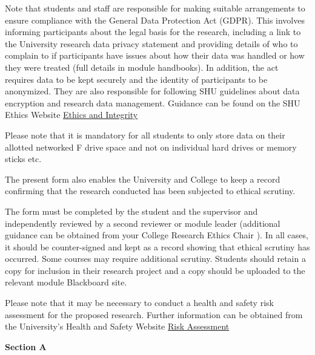 \documentclass{article}
\begin{document}
Note that students and staff are responsible for making suitable arrangements to ensure compliance with the General Data Protection Act (GDPR). This involves informing participants about the legal basis for the research, including a link to the University research data privacy statement and providing details of who to complain to if participants have issues about how their data was handled or how they were treated (full details in module handbooks).  In addition, the act requires data to be kept securely and the identity of participants to be anonymized. They are also responsible for following SHU guidelines about data encryption and research data management. Guidance can be found on the SHU Ethics Website \href{www.shu.ac.uk/research/excellence/ethics-and-integrity}{Ethics and Integrity}

Please note that it is mandatory for all students to only store data on their allotted networked F drive space and not on individual hard drives or memory sticks etc. 

The present form also enables the University and College to keep a record confirming that the research conducted has been subjected to ethical scrutiny.

The form must be completed by the student and the supervisor and independently reviewed by a second reviewer or module leader (additional guidance can be obtained from your College Research Ethics Chair ). In all cases, it should be counter-signed and kept as a record showing that ethical scrutiny has occurred. Some courses may require additional scrutiny. Students should retain a copy for inclusion in their research project and a copy should be uploaded to the relevant module Blackboard site. 

Please note that it may be necessary to conduct a health and safety risk assessment for the proposed research. Further information can be obtained from the University’s Health and Safety Website \href{https://sheffieldhallam.sharepoint.com/sites/3069/SitePages/Risk-Assessment.aspx}{Risk Assessment}

\textbf{Section A}
\end{document}
